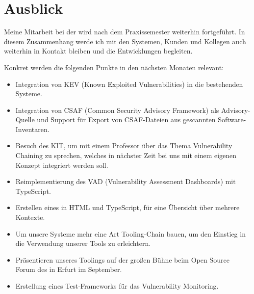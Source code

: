 
\chapter{Ausblick} \label{ch:ausblick}

Meine Mitarbeit bei der {\metaeffekt} wird nach dem Praxissemester weiterhin fortgeführt.
In diesem Zusammenhang werde ich mit den Systemen, Kunden und Kollegen auch weiterhin in Kontakt bleiben und die Entwicklungen begleiten.

Konkret werden die folgenden Punkte in den nächsten Monaten relevant:

\begin{itemize}
    \item Integration von KEV (Known Exploited Vulnerabilities) in die bestehenden Systeme.
    \item Integration von CSAF (Common Security Advisory Framework) als Advisory-Quelle und Support für Export von CSAF-Dateien aus gescannten Software-Inventaren.
    \item Besuch des KIT, um mit einem Professor über das Thema Vulnerability Chaining zu sprechen, welches in nächster Zeit bei uns mit einem eigenen Konzept integriert werden soll.
    \item Reimplementierung des VAD (Vulnerability Assessment Dashboards) mit TypeScript.
    \item Erstellen eines  in HTML und TypeScript, für eine Übersicht über mehrere Kontexte.
    \item Um unsere Systeme mehr eine Art Tooling-Chain bauen, um den Einstieg in die Verwendung unserer Tools zu erleichtern.
    \item Präsentieren unseres Toolings auf der großen Bühne beim Open Source Forum des {\bitkom} in Erfurt im September.
    \item Erstellung eines Test-Frameworks für das Vulnerability Monitoring.
\end{itemize}

